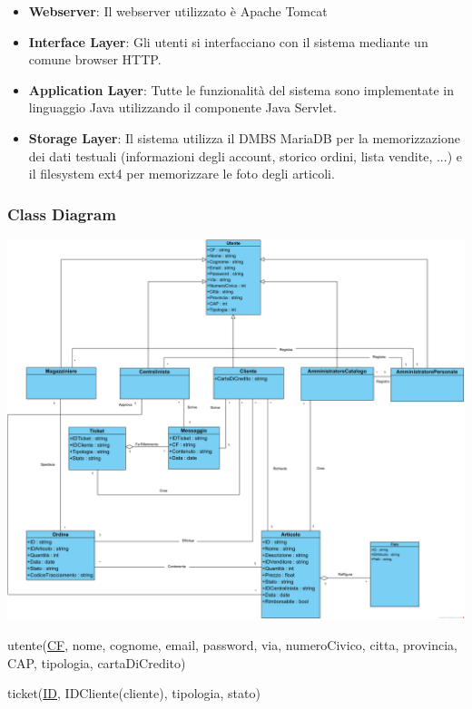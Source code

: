 \documentclass[12pt,a4paper]{article}
\begin{document}
\begin{itemize}
\item \textbf{Webserver}: Il webserver utilizzato è Apache Tomcat %
\item \textbf{Interface Layer}: Gli utenti si interfacciano con il sistema mediante un comune browser HTTP.
\item \textbf{Application Layer}: Tutte le funzionalità del sistema sono implementate in linguaggio Java utilizzando il componente Java Servlet.
\item \textbf{Storage Layer}: Il sistema utilizza il DMBS MariaDB per la memorizzazione dei dati testuali (informazioni degli account, storico ordini, lista vendite, ...) e il filesystem ext4 per memorizzare le foto degli articoli.
\end{itemize}

\newpage

\subsubsection{Class Diagram}
\begin{center}
\includegraphics[width=\textwidth]{../../RAD/img/diagrammadiclasse} \\
\end{center}

\noindent
utente(\underline{CF}, nome, cognome, email, password, via, numeroCivico, citta, provincia, CAP, tipologia, cartaDiCredito)

\noindent
ticket(\underline{ID}, IDCliente(cliente), tipologia, stato)
\end{document}
